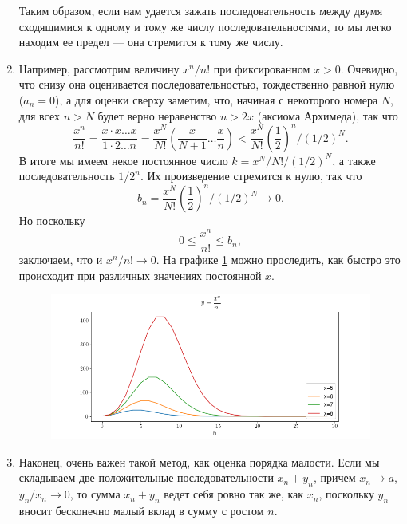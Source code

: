 \begin{enumerate}
Таким образом, если нам удается зажать последовательность между двумя сходящимися к одному и тому же числу последовательностями, то мы легко находим ее предел --- она стремится к тому же числу.





\item Например, рассмотрим величину $x^n/n!$ при фиксированном $x>0$. Очевидно, что снизу она оценивается последовательностью, тождественно равной нулю ($a_n=0$), а для оценки сверху заметим, что, начиная с некоторого номера $N$, для всех $n>N$ будет верно неравенство $n>2x$ (аксиома Архимеда), так что
$$
\frac{x^n}{n!}=\frac{x\cdot x\dots x}{1\cdot 2\dots n}=\frac{x^N}{N!}\left(\frac{x}{N+1}\dots\frac{x}{n}\right)<
\frac{x^N}{N!}\left(\frac 12\right)^{n}/(1/2)^N.
$$
В итоге мы имеем некое постоянное число $k=x^N/N!/(1/2)^N$, а также последовательность $1/2^n$. Их произведение стремится к нулю, так что
$$
b_n=\frac{x^N}{N!}\left(\frac 12\right)^{n}/(1/2)^N\to 0.
$$
Но поскольку 
$$
0\le\frac{x^n}{n!}\le b_n,
$$
заключаем, что и $x^n/n!\to 0$. На графике \ref{fact} можно проследить, как быстро это происходит при различных значениях постоянной $x$.

\begin{figure}[hbt!]
\begin{center}
\includegraphics[scale=0.5]{fact.png}
\end{center}\caption{}\label{fact}
\end{figure}


\item Наконец, очень важен такой метод, как оценка порядка малости. Если мы складываем две положительные последовательности $x_n+y_n$, причем $x_n\to a$, $y_n/x_n\to 0$, то сумма $x_n+y_n$ ведет себя ровно так же, как $x_n$, поскольку $y_n$ вносит бесконечно малый вклад в сумму с ростом $n$.


\end{enumerate}
